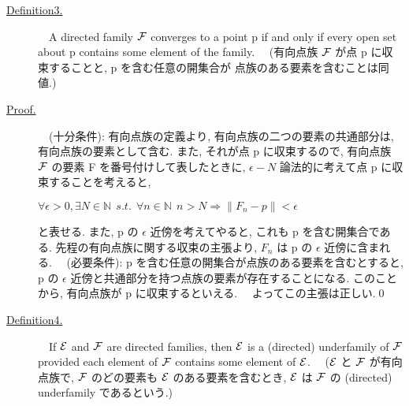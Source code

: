 \documentclass{msjproc}
\begin{document}
	\begin{description}
		\item[\underline{Definition3.}]
		　A directed family $\cal{F}$ converges to a point p 
		if and only if every open set about p contains some element of the family.
		\newline
		　(有向点族 $\cal{F}$ が点 p に収束することと,  p を含む任意の開集合が
		点族のある要素を含むことは同値.)
		
		\item[\underline{Proof.}]
		　(十分条件):
		有向点族の定義より, 有向点族の二つの要素の共通部分は, 
		有向点族の要素として含む. また, それが点 p に収束するので, 
		有向点族 $\cal{F}$ の要素 F を番号付けして表したときに, 
		$\epsilon - N$ 論法的に考えて点 p に収束することを考えると, 
		\newline\newline
		\centerline{$\forall \epsilon > 0, \exists N \in \mathbb{N} 
		\>\> s.t. \>\> \forall n \in \mathbb{N} \>\> n > N 
		\Rightarrow \|F_n - p\| < \epsilon$}
		\newline\newline
		と表せる. また, p の $\epsilon$ 近傍を考えてやると, これも p を含む開集合である. 
		先程の有向点族に関する収束の主張より, $F_n$ は p の $\epsilon$ 近傍に含まれる.
		\newline
		　(必要条件):
		p を含む任意の開集合が点族のある要素を含むとすると, 
		p の $\epsilon$ 近傍と共通部分を持つ点族の要素が存在することになる.
		このことから, 有向点族が p に収束するといえる.
		\newline　よってこの主張は正しい.\qed
	\end{description}

	\begin{description}
		\item[\underline{Definition4.}]
		　If $\cal{E}$ and $\cal{F}$ are directed families, 
		then $\cal{E}$ is a (directed) underfamily of $\cal{F}$ provided each 
		element of $\cal{F}$ contains some element of $\cal{E}$.
		\newline
		　($\cal{E}$ と $\cal{F}$ が有向点族で, $\cal{F}$ のどの要素も $\cal{E}$ 
		のある要素を含むとき, $\cal{E}$ は $\cal{F}$ の (directed) underfamily
		であるという.)
	\end{description}
\end{document}
